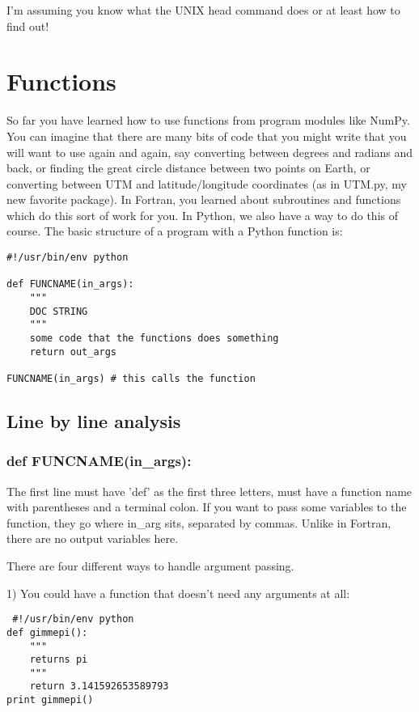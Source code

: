 {\noindent  I'm assuming you know what the UNIX {\color{blue}head} command does or at least how to find out! 


\section{Functions}

So far you have learned how to use functions from program modules like {\color{blue}NumPy}.  You can imagine that there are many bits of code that you might write that you will want to use again and again, say converting between degrees and radians and back, or finding the great circle distance between two points on Earth, or converting between UTM and latitude/longitude coordinates (as in {\color{blue}UTM.py}, my new favorite package).   In Fortran, you learned about subroutines and functions which do this sort of work for you.  In Python, we also have a way to do this of course.    The basic structure of a program with a  Python function is: 


{\singlespacing \color{blue} \begin{verbatim}
#!/usr/bin/env python

def FUNCNAME(in_args):  
    """
    DOC STRING
    """
    some code that the functions does something
    return out_args
    
FUNCNAME(in_args) # this calls the function
\end{verbatim}}



\subsection{Line by line analysis}
\subsubsection{def FUNCNAME(in\_args):}

\noindent The first line must have 'def' as the first three letters, must have a function name with parentheses and a terminal colon.  If you want to pass some variables to the function, they go where  in\_arg sits, separated by commas.  Unlike in Fortran, there are no output variables here.  

 There are four different ways to handle argument passing. 
 
 1) You could have a function that doesn't  need any arguments at all:
 
 {\singlespacing \color{blue} \begin{verbatim}
 #!/usr/bin/env python
def gimmepi():  
    """
    returns pi
    """
    return 3.141592653589793
print gimmepi()
\end{verbatim}}

}
